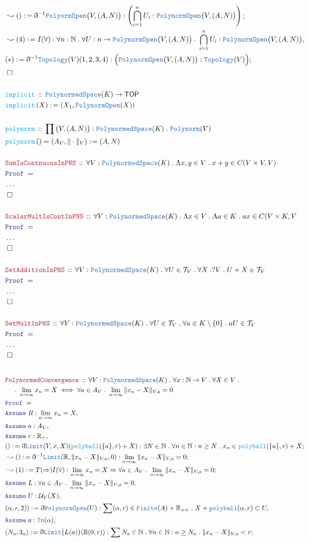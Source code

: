 \documentclass[12pt]{scrartcl}
\newcommand{\TYPE}[1]{\textcolor{NavyBlue}{\mathtt{#1}}}
\newcommand{\FUNC}[1]{\textcolor{Cerulean}{\mathtt{#1}}}
\newcommand{\LOGIC}[1]{\textcolor{Blue}{\mathtt{#1}}}
\newcommand{\THM}[1]{\textcolor{Maroon}{\mathtt{#1}}}
\renewcommand{\.}{\; . \;}
\newcommand{\de}{: \kern 0.1pc =}
\newcommand{\Act}[1]{\left( #1 \right)}
\newcommand{\Theorem}[2]{& \THM{#1} \, :: \, #2 \\ & \Proof = \\ }
\newcommand{\DeclareFunc}[2]{& \FUNC{#1} \, :: \, #2 \\}
\newcommand{\DefineFunc}[3]{&  \FUNC{#1}\Act{#2} \de #3 \\}
\newcommand{\DefineNamedFunc}[4]{&  \FUNC{#1}\Act{#2} = #3 \de #4 \\}
\newcommand{\NewLine}{\\ & \kern 1pc}
\newcommand{\Page}[1]{\begin{align*} #1 \end{align*} \newpage   }
\newcommand{ \bd }{ \ByDef }
\newcommand{\NoProof}{ & \ldots \\ \EndProof}
\newcommand{\Reals}{\mathbb{R} }
\newcommand{\Nat}{\mathbb{N} }
\newcommand{\Say}[3]{& #1 \de #2 : #3, \\}
\newcommand{\Conclude}[3]{& #1 \de #2 : #3; \\}
\newcommand{\Derive}[3]{& \leadsto #1 \de #2 : #3, \\}
\newcommand{\DeriveConclude}[3]{& \leadsto #1 \de #2 : #3 ; \\}
\newcommand{\A}{\LOGIC{Assume} \;}
\newcommand{\Assume}[2]{& \A #1 : #2, \\}
\newcommand{\QED}{\; \square}
\newcommand{\EndProof}{& \QED \\}
\newcommand{\ByDef}{\eth}
\newcommand{\Proof}{\LOGIC{Proof} \; }
\newcommand{\TOP}{ \mathsf{TOP}  }
\newcommand{\PNS}{\TYPE{PolynormedSpace}}
\begin{document}
{ }\Page{
 \DeriveConclude{()}{ \bd^{-1} \TYPE{PolyormOpen}\big(V,(A,N)\big)}{\left(  \bigcap_{i = 1}^n U_i : \TYPE{PolynormOpen}\big(V, (A,N ) \big) \right)}
 \Derive{(4)}{I(\forall)}{ \forall n : \Nat \. \forall U : n \to\TYPE{PolynormOpen}\big(V,(A,N)\big)\. \bigcap_{i = 1}^n U_i :\TYPE{PolynormOpen}\big(V,(A,N)\big)}
 \Conclude{(*)}{\bd^{-1} \TYPE{Topology}(V)(1,2,3,4)}{ \Big( \TYPE{PolynormOpen}\big(V,(A,N)\big) : \TYPE{Topology}(V)  \Big) }
 \EndProof \\
 \DeclareFunc{implicit}{ \PNS(K) \to \TOP  }
 \DefineFunc{implicit}{ X }{ (X_1, \TYPE{PolynormOpen}(X))} \\
 \DeclareFunc{polynorm}{ \prod  \big(V, (A,N) \big) : \PNS(K) \. \TYPE{Polynorm}(V)}
 \DefineNamedFunc{polynorm}{}{  (A_V, \| \cdot  \|_V)  }{ (A,N) } \\
 \Theorem{ SumIsContnuousInPNS}{ \forall V : \PNS(K) \. \Lambda x,y \in V \. x + y \in C(V \times V, V) }
 \NoProof \\
 \Theorem{ScalarMultIsContInPNS}{ \forall V : \PNS(K) \. \Lambda x \in V \. \Lambda a \in K \. ax \in C(V \times K,V  }
 \NoProof \\
 \Theorem{SetAdditionInPNS}{ \forall V : \PNS(K) \. \forall U \in \mathcal{T}_V \. \forall X : ?V \. U + X \in \mathcal{T}_V}
 \NoProof \\
 \Theorem{SetMultInPNS}{ \forall V : \PNS(K) \. \forall U \in \mathcal{T}_V \. \forall a \in K \setminus \{ 0 \} \. aU \in \mathcal{T}_V} 
 \NoProof \\
} \Page{
	\Theorem{PolynormedConvergence}{ \forall V : \PNS(K) \. \forall  x : \Nat \to V \. \forall X \in V \. 
	\NewLine \.
	\lim_{n \to \infty} x_n = X \iff \forall a \in A_V \. \lim_{n \to \infty} \|x_n - X \|_{V,a} = 0  }
 \Assume{R}{ \lim_{n \to \infty} x_n = X}
 \Assume{a}{A_V}
 \Assume{r}{\Reals_+}
 \Conclude{()}{ \bd \TYPE{Limit}(V,x,X)( \FUNC{polyball}(\{a\},r) + X ) }{\exists N \in \Nat \. \forall n \in \Nat :  n \ge N \. x_n \in \FUNC{polyball}(\{a\},r) + X }
 \DeriveConclude{()}{\bd^{-1} \TYPE{Limit}(\Reals,\|x_n - X\|_{V,a}, 0 )}{ \lim_{n \to \infty} \| x_n - X \|_{V,a} = 0}
 \DeriveConclude{(1)}{T(\Rightarrow)I(\forall)}{ \lim_{n \to \infty} x_n = X \Rightarrow \forall a \in A_V \. \lim_{n \to \infty} \| x_n - X \|_{V,a} = 0}
 \Assume{L}{ \forall a \in A_V \. \lim_{n \to \infty} \| x_n - X   \|_{V,a} = 0}
 \Assume{U}{\mathcal{U}_V(X)}
 \Say{(\alpha,r,2))}{ \bd \TYPE{PolynormOpen}(U)}{ \sum (\alpha,r) \in \TYPE{Finite}(A) \times \Reals_{++} \. X + \TYPE{polyball}(\alpha,r) \subset U }
 \Assume{a}{\TYPE{In}(\alpha)}
 \Conclude{(N_a,3_a)}{ \bd \TYPE{Limit}\big(L(a)\big)( \mathbb{B}(0,r) )}{ \sum N_a \in \Nat \. \forall n \in \Nat : n \ge N_a \. \| x_n - X \|_{V,a} < r }
}
\end{document}
